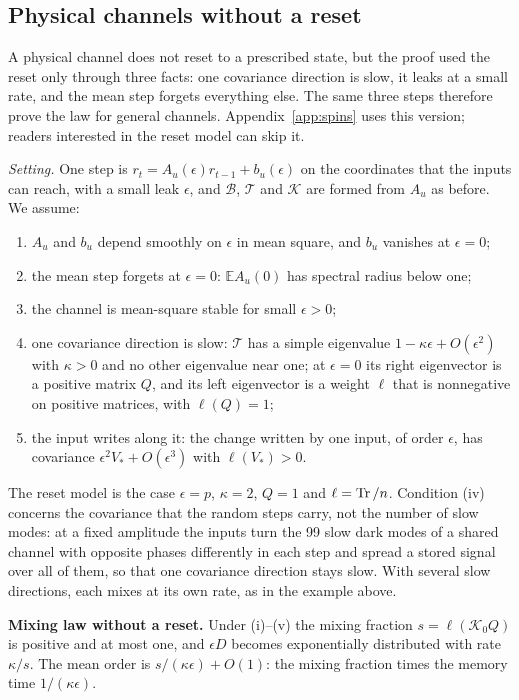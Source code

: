 \subsection{Physical channels without a reset}
\label{app:physical}
A physical channel does not reset to a prescribed state, but the proof used the reset only through three facts: one
covariance direction is slow, it leaks at a small rate, and the mean step forgets everything else. The same three
steps therefore prove the law for general channels. Appendix~\ref{app:spins} uses this version; readers interested in
the reset model can skip it.

\emph{Setting.} One step is $r_t=A_u(\epsilon)r_{t-1}+b_u(\epsilon)$ on the coordinates that the inputs can reach,
with a small leak $\epsilon$, and $\mathcal B$, $\mathcal T$ and $\mathcal K$ are formed from $A_u$ as before. We
assume:
\begin{enumerate}[label=(\roman*),leftmargin=*,itemsep=2pt,topsep=4pt]
\item $A_u$ and $b_u$ depend smoothly on $\epsilon$ in mean square, and $b_u$ vanishes at $\epsilon=0$;
\item the mean step forgets at $\epsilon=0$: $\mathbb EA_u(0)$ has spectral radius below one;
\item the channel is mean-square stable for small $\epsilon>0$;
\item one covariance direction is slow: $\mathcal T$ has a simple eigenvalue $1-\kappa\epsilon+O(\epsilon^2)$ with
  $\kappa>0$ and no other eigenvalue near one; at $\epsilon=0$ its right eigenvector is a positive matrix $Q$, and its
  left eigenvector is a weight $\ell$ that is nonnegative on positive matrices, with $\ell(Q)=1$;
\item the input writes along it: the change written by one input, of order $\epsilon$, has covariance
  $\epsilon^2V_*+O(\epsilon^3)$ with $\ell(V_*)>0$.
\end{enumerate}
The reset model is the case $\epsilon=p$, $\kappa=2$, $Q=1$ and $\ell=\operatorname{Tr}/n$. Condition (iv) concerns the
covariance that the random steps carry, not the number of slow modes: at a fixed amplitude the inputs turn the 99
slow dark modes of a shared channel with opposite phases differently in each step and spread a stored signal over
all of them, so that one covariance direction stays slow. With several slow directions, each mixes at its own rate,
as in the example above.

\begin{keybox}
\textbf{Mixing law without a reset.} Under (i)--(v) the mixing fraction $s=\ell(\mathcal K_0Q)$ is positive and at
most one, and $\epsilon D$ becomes exponentially distributed with rate $\kappa/s$. The mean order is
$s/(\kappa\epsilon)+O(1)$: the mixing fraction times the memory time $1/(\kappa\epsilon)$.
\end{keybox}

